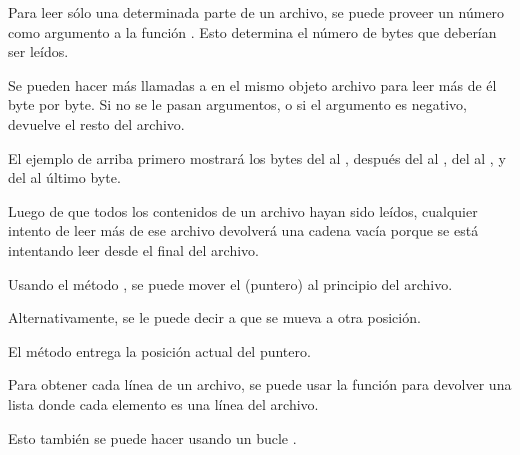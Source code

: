 
Para leer sólo una determinada parte de un archivo, se puede proveer un número como argumento a la función .
Esto determina el número de bytes que deberían ser leídos.

Se pueden hacer más llamadas a  en el mismo objeto archivo para leer más de él byte por byte.
Si no se le pasan argumentos, o si el argumento es negativo,  devuelve el resto del archivo.


El ejemplo de arriba primero mostrará los bytes del  al , después del  al , del  al , y del  al último byte.

Luego de que todos los contenidos de un archivo hayan sido leídos, cualquier intento de leer más de ese archivo devolverá una cadena vacía \ttt{\qq \qq} porque se está intentando leer desde el final del archivo.


Usando el método , se puede mover el  (puntero) al principio del archivo.


Alternativamente, se le puede decir a  que se mueva a otra posición.


El método  entrega la posición actual del puntero.


Para obtener cada línea de un archivo, se puede usar la función  para devolver una lista donde cada elemento es una línea del archivo.


Esto también se puede hacer usando un bucle .

